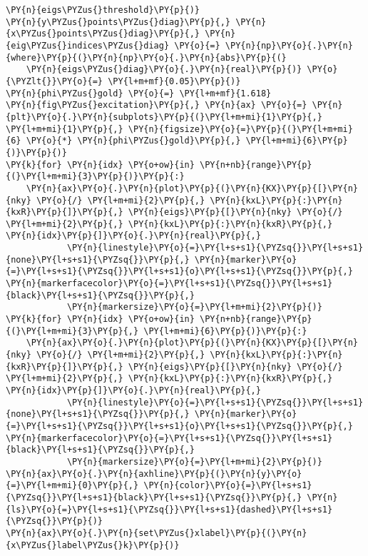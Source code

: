 \begin{Verbatim}[commandchars=\\\{\}]
                                           \PY{n}{eigs\PYZus{}threshold}\PY{p}{)}
\PY{n}{y\PYZus{}points\PYZus{}diag}\PY{p}{,} \PY{n}{x\PYZus{}points\PYZus{}diag}\PY{p}{,} \PY{n}{eig\PYZus{}indices\PYZus{}diag} \PY{o}{=} \PY{n}{np}\PY{o}{.}\PY{n}{where}\PY{p}{(}\PY{n}{np}\PY{o}{.}\PY{n}{abs}\PY{p}{(}
    \PY{n}{eigs\PYZus{}diag}\PY{o}{.}\PY{n}{real}\PY{p}{)} \PY{o}{\PYZlt{}}\PY{o}{=} \PY{l+m+mf}{0.05}\PY{p}{)}
\PY{n}{phi\PYZus{}gold} \PY{o}{=} \PY{l+m+mf}{1.618}
\PY{n}{fig\PYZus{}excitation}\PY{p}{,} \PY{n}{ax} \PY{o}{=} \PY{n}{plt}\PY{o}{.}\PY{n}{subplots}\PY{p}{(}\PY{l+m+mi}{1}\PY{p}{,} \PY{l+m+mi}{1}\PY{p}{,} \PY{n}{figsize}\PY{o}{=}\PY{p}{(}\PY{l+m+mi}{6} \PY{o}{*} \PY{n}{phi\PYZus{}gold}\PY{p}{,} \PY{l+m+mi}{6}\PY{p}{)}\PY{p}{)}
\PY{k}{for} \PY{n}{idx} \PY{o+ow}{in} \PY{n+nb}{range}\PY{p}{(}\PY{l+m+mi}{3}\PY{p}{)}\PY{p}{:}
    \PY{n}{ax}\PY{o}{.}\PY{n}{plot}\PY{p}{(}\PY{n}{KX}\PY{p}{[}\PY{n}{nky} \PY{o}{/} \PY{l+m+mi}{2}\PY{p}{,} \PY{n}{kxL}\PY{p}{:}\PY{n}{kxR}\PY{p}{]}\PY{p}{,} \PY{n}{eigs}\PY{p}{[}\PY{n}{nky} \PY{o}{/} \PY{l+m+mi}{2}\PY{p}{,} \PY{n}{kxL}\PY{p}{:}\PY{n}{kxR}\PY{p}{,} \PY{n}{idx}\PY{p}{]}\PY{o}{.}\PY{n}{real}\PY{p}{,}
            \PY{n}{linestyle}\PY{o}{=}\PY{l+s+s1}{\PYZsq{}}\PY{l+s+s1}{none}\PY{l+s+s1}{\PYZsq{}}\PY{p}{,} \PY{n}{marker}\PY{o}{=}\PY{l+s+s1}{\PYZsq{}}\PY{l+s+s1}{o}\PY{l+s+s1}{\PYZsq{}}\PY{p}{,} \PY{n}{markerfacecolor}\PY{o}{=}\PY{l+s+s1}{\PYZsq{}}\PY{l+s+s1}{black}\PY{l+s+s1}{\PYZsq{}}\PY{p}{,}
            \PY{n}{markersize}\PY{o}{=}\PY{l+m+mi}{2}\PY{p}{)}
\PY{k}{for} \PY{n}{idx} \PY{o+ow}{in} \PY{n+nb}{range}\PY{p}{(}\PY{l+m+mi}{3}\PY{p}{,} \PY{l+m+mi}{6}\PY{p}{)}\PY{p}{:}
    \PY{n}{ax}\PY{o}{.}\PY{n}{plot}\PY{p}{(}\PY{n}{KX}\PY{p}{[}\PY{n}{nky} \PY{o}{/} \PY{l+m+mi}{2}\PY{p}{,} \PY{n}{kxL}\PY{p}{:}\PY{n}{kxR}\PY{p}{]}\PY{p}{,} \PY{n}{eigs}\PY{p}{[}\PY{n}{nky} \PY{o}{/} \PY{l+m+mi}{2}\PY{p}{,} \PY{n}{kxL}\PY{p}{:}\PY{n}{kxR}\PY{p}{,} \PY{n}{idx}\PY{p}{]}\PY{o}{.}\PY{n}{real}\PY{p}{,}
            \PY{n}{linestyle}\PY{o}{=}\PY{l+s+s1}{\PYZsq{}}\PY{l+s+s1}{none}\PY{l+s+s1}{\PYZsq{}}\PY{p}{,} \PY{n}{marker}\PY{o}{=}\PY{l+s+s1}{\PYZsq{}}\PY{l+s+s1}{o}\PY{l+s+s1}{\PYZsq{}}\PY{p}{,} \PY{n}{markerfacecolor}\PY{o}{=}\PY{l+s+s1}{\PYZsq{}}\PY{l+s+s1}{black}\PY{l+s+s1}{\PYZsq{}}\PY{p}{,}
            \PY{n}{markersize}\PY{o}{=}\PY{l+m+mi}{2}\PY{p}{)}
\PY{n}{ax}\PY{o}{.}\PY{n}{axhline}\PY{p}{(}\PY{n}{y}\PY{o}{=}\PY{l+m+mi}{0}\PY{p}{,} \PY{n}{color}\PY{o}{=}\PY{l+s+s1}{\PYZsq{}}\PY{l+s+s1}{black}\PY{l+s+s1}{\PYZsq{}}\PY{p}{,} \PY{n}{ls}\PY{o}{=}\PY{l+s+s1}{\PYZsq{}}\PY{l+s+s1}{dashed}\PY{l+s+s1}{\PYZsq{}}\PY{p}{)}
\PY{n}{ax}\PY{o}{.}\PY{n}{set\PYZus{}xlabel}\PY{p}{(}\PY{n}{x\PYZus{}label\PYZus{}k}\PY{p}{)}

\end{Verbatim}
